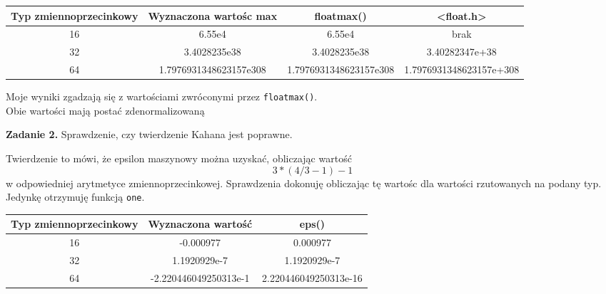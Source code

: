 \documentclass[15pt, a4paper]{article}
\begin{document}
\begin{table}[ht]
    \begin{adjustbox}{max width=\textwidth}
    \begin{tabular}{|c|c|c|c|}
        \hline 
        Typ zmiennoprzecinkowy & Wyznaczona wartośc max & floatmax() & <float.h> \\ \hline
        16 & 6.55e4 & 6.55e4 & brak \\ \hline
        32 & 3.4028235e38 & 3.4028235e38 & 3.40282347e+38 \\ \hline
        64 & 1.7976931348623157e308 & 1.7976931348623157e308 & 1.7976931348623157e+308 \\ \hline
    \end{tabular}
    \end{adjustbox}
    \label{tab:max}
\end{table}

Moje wyniki zgadzają się z wartościami zwróconymi przez \verb|floatmax()|. \\
Obie wartości mają postać zdenormalizowaną

\noindent\hrulefill


\vspace{0.5cm}

\noindent\textbf{Zadanie 2.} Sprawdzenie, czy twierdzenie Kahana jest poprawne.

\vspace{0.5cm}

Twierdzenie to mówi, że epsilon maszynowy można uzyskać, obliczając wartość \[3 * (4 / 3 - 1) - 1\] w odpowiedniej arytmetyce zmiennoprzecinkowej. Sprawdzenia dokonuję obliczając tę wartośc dla wartości rzutowanych na podany typ. Jedynkę otrzymuję funkcją \verb|one|.

\begin{table}[ht]
    \begin{adjustbox}{max width=\textwidth}
    \begin{tabular}{|c|c|c|}
        \hline 
        Typ zmiennoprzecinkowy & Wyznaczona wartość & eps() \\ \hline
        16 & -0.000977 & 0.000977 \\ \hline
        32 & 1.1920929e-7 & 1.1920929e-7 \\ \hline
        64 & -2.220446049250313e-1 & 2.220446049250313e-16 \\ \hline
    \end{tabular}
    \end{adjustbox}
    \label{tab:kahan}
\end{table}
\end{document}
